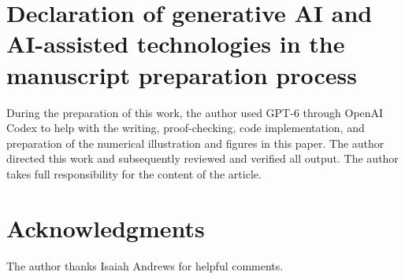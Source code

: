 \documentclass[11pt]{article}
\begin{document}
\section*{Declaration of generative AI and AI-assisted technologies in the manuscript preparation process}

During the preparation of this work, the author used GPT-6 through OpenAI Codex to help with the writing, proof-checking, code implementation, and preparation of the numerical illustration and figures in this paper. The author directed this work and subsequently reviewed and verified all output. The author takes full responsibility for the content of the article.

\section*{Acknowledgments}

The author thanks Isaiah Andrews for helpful comments.



\end{document}
